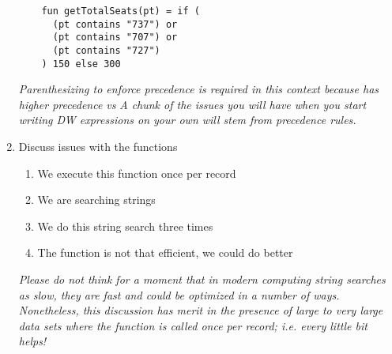 \begin{enumerate}[resume*]
\begin{verbatim}
    fun getTotalSeats(pt) = if (
      (pt contains "737") or
      (pt contains "707") or
      (pt contains "727")
    ) 150 else 300
  \end{verbatim}
  \emph{
    Parenthesizing to enforce precedence is required in this context because  has higher precedence vs 
  }
  \emph{
    A chunk of the issues you will have when you start writing DW expressions on your own will stem from precedence rules.
  }
\item Discuss issues with the  functions
  \begin{enumerate}
  \item We execute this function once per record
  \item We are searching strings
  \item We do this string search three times
  \item The function is not that efficient, we could do better
  \end{enumerate}
  \emph{
    Please do not think for a moment that in modern computing string searches as slow, they are fast and could
    be optimized in a number of ways.  Nonetheless, this discussion has merit in the presence of large to very
    large data sets where the function is called once per record; i.e. every little bit helps!
  }
\end{enumerate}

